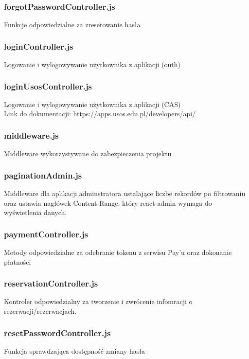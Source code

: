 \documentclass[titlepage]{article}
\begin{document}
\subsubsection{forgotPasswordController.js}
Funkcje odpowiedzialne za zresetowanie hasła

\subsubsection{loginController.js}
Logowanie i wylogowywanie użytkownika z aplikacji (outh)

\subsubsection{loginUsosController.js}
Logowanie i wylogowywanie użytkownika z aplikacji (CAS) \\
Link do dokumentacji: \url{https://apps.usos.edu.pl/developers/api/}

\subsubsection{middleware.js}
Middleware wykorzystywane do zabezpieczenia projektu

\subsubsection{paginationAdmin.js}
Middleware dla aplikacji adminstratora ustalające liczbe rekordów po filtrowaniu oraz ustawia nagłówek Content-Range, który react-admin wymaga do wyświetlenia danych.

\subsubsection{paymentController.js}
Metody odpowiedzialne za odebranie tokenu z serwisu Pay'u oraz dokonanie płatności

\subsubsection{reservationController.js}
Kontroler odpowiedzialny za tworzenie i zwrócenie infomracji o rezerwacji/rezerwacjach.

\subsubsection{resetPasswordController.js}
Funkcja sprawdzająca dostępność zmiany hasła
\end{document}
